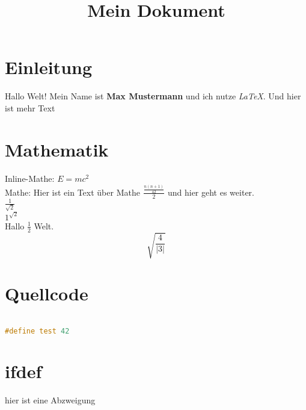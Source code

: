 \documentclass{article}
\title{Mein Dokument}
\author{}
\begin{document}
\maketitle

\section{Einleitung}
Hallo Welt! 
Mein Name ist \textbf{Max Mustermann} und ich nutze \textit{LaTeX}.
Und hier ist mehr Text

\section{Mathematik}
Inline-Mathe: $E = mc^2$  \\
Mathe: Hier ist ein Text über Mathe \(\frac{\frac{n(n+1)}{ 42}}{ 2}\) und hier geht es weiter.\\  

\(\frac{1}{ \sqrt{2}}\) \\

\({1}^{ \sqrt{2}}\) \\

Hallo \(\frac{1}{ 2}\) Welt.  
\[\sqrt{\frac{4}{ \left|3\right|}}\]

\section{Quellcode}

\begin{lstlisting}[language=c++]

#define test 42

\end{lstlisting}


\section{ifdef}
hier ist eine Abzweigung
\end{document}
